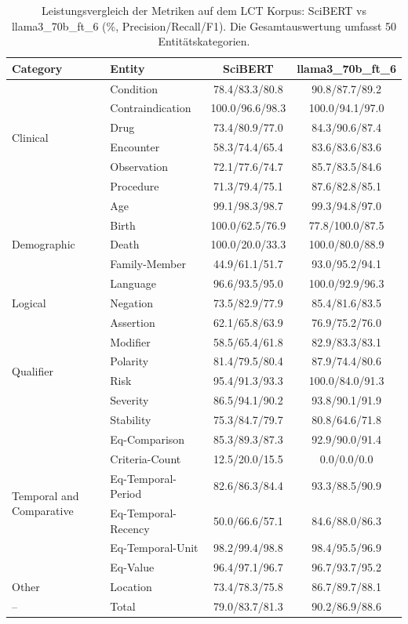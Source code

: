 
\begin{table}[htbp]
\centering
\begin{tabular}{llcc}
\toprule
\textbf{Category} & \textbf{Entity} & \textbf{SciBERT} & \textbf{llama3_70b_ft_6} \\
\midrule
\multirow{6}{*}{Clinical} & Condition & 78.4/83.3/80.8 & 90.8/87.7/89.2 \\
 & Contraindication & 100.0/96.6/98.3 & 100.0/94.1/97.0 \\
 & Drug & 73.4/80.9/77.0 & 84.3/90.6/87.4 \\
 & Encounter & 58.3/74.4/65.4 & 83.6/83.6/83.6 \\
 & Observation & 72.1/77.6/74.7 & 85.7/83.5/84.6 \\
 & Procedure & 71.3/79.4/75.1 & 87.6/82.8/85.1 \\
\midrule
\multirow{5}{*}{Demographic} & Age & 99.1/98.3/98.7 & 99.3/94.8/97.0 \\
 & Birth & 100.0/62.5/76.9 & 77.8/100.0/87.5 \\
 & Death & 100.0/20.0/33.3 & 100.0/80.0/88.9 \\
 & Family-Member & 44.9/61.1/51.7 & 93.0/95.2/94.1 \\
 & Language & 96.6/93.5/95.0 & 100.0/92.9/96.3 \\
\midrule
Logical & Negation & 73.5/82.9/77.9 & 85.4/81.6/83.5 \\
\midrule
\multirow{6}{*}{Qualifier} & Assertion & 62.1/65.8/63.9 & 76.9/75.2/76.0 \\
 & Modifier & 58.5/65.4/61.8 & 82.9/83.3/83.1 \\
 & Polarity & 81.4/79.5/80.4 & 87.9/74.4/80.6 \\
 & Risk & 95.4/91.3/93.3 & 100.0/84.0/91.3 \\
 & Severity & 86.5/94.1/90.2 & 93.8/90.1/91.9 \\
 & Stability & 75.3/84.7/79.7 & 80.8/64.6/71.8 \\
\midrule
\multirow{6}{*}{Temporal and Comparative} & Eq-Comparison & 85.3/89.3/87.3 & 92.9/90.0/91.4 \\
 & Criteria-Count & 12.5/20.0/15.5 & 0.0/0.0/0.0 \\
 & Eq-Temporal-Period & 82.6/86.3/84.4 & 93.3/88.5/90.9 \\
 & Eq-Temporal-Recency & 50.0/66.6/57.1 & 84.6/88.0/86.3 \\
 & Eq-Temporal-Unit & 98.2/99.4/98.8 & 98.4/95.5/96.9 \\
 & Eq-Value & 96.4/97.1/96.7 & 96.7/93.7/95.2 \\
\midrule
Other & Location & 73.4/78.3/75.8 & 86.7/89.7/88.1 \\
\midrule
-- & Total & 79.0/83.7/81.3 & 90.2/86.9/88.6 \\
\bottomrule
\end{tabular}
\caption{Leistungsvergleich der Metriken auf dem LCT Korpus: SciBERT vs llama3_70b_ft_6 (\%, Precision/Recall/F1). Die Gesamtauswertung umfasst 50 Entitätskategorien.}
\label{tab:metrics_comparison}
\end{table}
    